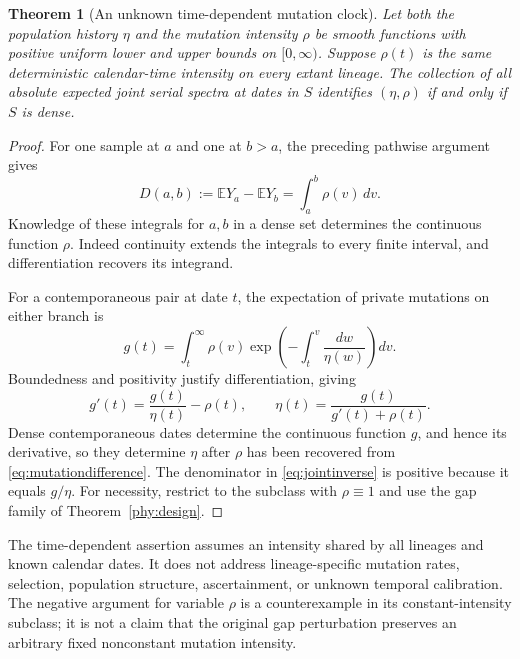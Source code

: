\documentclass[11pt]{article}
\newtheorem{theorem}{Theorem}[section]
\theoremstyle{definition}
\theoremstyle{remark}
\newcommand{\E}{\mathbb E}
\numberwithin{equation}{section}
\begin{document}
\begin{theorem}[An unknown time-dependent mutation clock]
\label{thm:mutationvariable}
Let both the population history $\eta$ and the mutation intensity
$\rho$ be smooth functions with positive uniform lower and upper
bounds on $[0,\infty)$. Suppose $\rho(t)$ is the same deterministic
calendar-time intensity on every extant lineage. The collection of
all absolute expected joint serial spectra at dates in $S$ identifies
$(\eta,\rho)$ if and only if $S$ is dense.
\end{theorem}
\begin{proof}
For one sample at $a$ and one at $b>a$, the preceding pathwise
argument gives
\begin{equation}\label{eq:mutationdifference}
 D(a,b):=\E Y_a-\E Y_b=\int_a^b\rho(v)\,dv.
\end{equation}
Knowledge of these integrals for $a,b$ in a dense set determines the
continuous function $\rho$. Indeed continuity extends the integrals
to every finite interval, and differentiation recovers its integrand.

For a contemporaneous pair at date $t$, the expectation of private
mutations on either branch is
\[
 g(t)=\int_t^\infty\rho(v)
       \exp\left(-\int_t^v\frac{dw}{\eta(w)}\right)dv.
\]
Boundedness and positivity justify differentiation, giving
\begin{equation}\label{eq:jointinverse}
 g'(t)=\frac{g(t)}{\eta(t)}-\rho(t),\qquad
 \eta(t)=\frac{g(t)}{g'(t)+\rho(t)}.
\end{equation}
Dense contemporaneous dates determine the continuous function $g$,
and hence its derivative, so they determine $\eta$ after $\rho$ has
been recovered from \eqref{eq:mutationdifference}. The denominator
in \eqref{eq:jointinverse} is positive because it equals $g/\eta$.
For necessity, restrict to the subclass with $\rho\equiv1$ and use
the gap family of Theorem~\ref{phy:design}.
\end{proof}

The time-dependent assertion assumes an intensity shared by all
lineages and known calendar dates. It does not address lineage-specific
mutation rates, selection, population structure, ascertainment, or
unknown temporal calibration. The negative argument for variable
$\rho$ is a counterexample in its constant-intensity subclass; it is
not a claim that the original gap perturbation preserves an arbitrary
fixed nonconstant mutation intensity.
\end{document}
